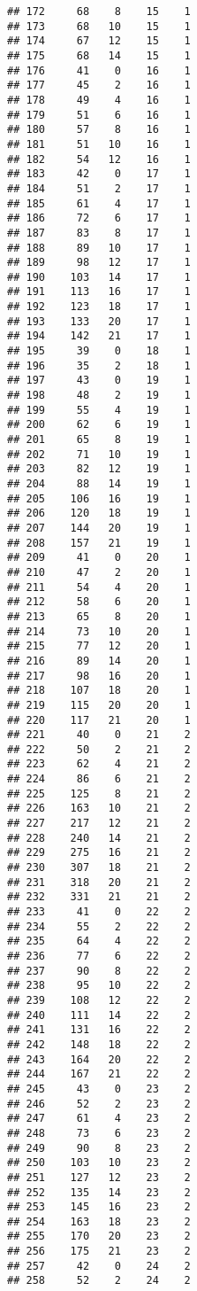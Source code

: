 \documentclass[
]{article}
\begin{document}
\begin{verbatim}
## 172     68    8    15    1
## 173     68   10    15    1
## 174     67   12    15    1
## 175     68   14    15    1
## 176     41    0    16    1
## 177     45    2    16    1
## 178     49    4    16    1
## 179     51    6    16    1
## 180     57    8    16    1
## 181     51   10    16    1
## 182     54   12    16    1
## 183     42    0    17    1
## 184     51    2    17    1
## 185     61    4    17    1
## 186     72    6    17    1
## 187     83    8    17    1
## 188     89   10    17    1
## 189     98   12    17    1
## 190    103   14    17    1
## 191    113   16    17    1
## 192    123   18    17    1
## 193    133   20    17    1
## 194    142   21    17    1
## 195     39    0    18    1
## 196     35    2    18    1
## 197     43    0    19    1
## 198     48    2    19    1
## 199     55    4    19    1
## 200     62    6    19    1
## 201     65    8    19    1
## 202     71   10    19    1
## 203     82   12    19    1
## 204     88   14    19    1
## 205    106   16    19    1
## 206    120   18    19    1
## 207    144   20    19    1
## 208    157   21    19    1
## 209     41    0    20    1
## 210     47    2    20    1
## 211     54    4    20    1
## 212     58    6    20    1
## 213     65    8    20    1
## 214     73   10    20    1
## 215     77   12    20    1
## 216     89   14    20    1
## 217     98   16    20    1
## 218    107   18    20    1
## 219    115   20    20    1
## 220    117   21    20    1
## 221     40    0    21    2
## 222     50    2    21    2
## 223     62    4    21    2
## 224     86    6    21    2
## 225    125    8    21    2
## 226    163   10    21    2
## 227    217   12    21    2
## 228    240   14    21    2
## 229    275   16    21    2
## 230    307   18    21    2
## 231    318   20    21    2
## 232    331   21    21    2
## 233     41    0    22    2
## 234     55    2    22    2
## 235     64    4    22    2
## 236     77    6    22    2
## 237     90    8    22    2
## 238     95   10    22    2
## 239    108   12    22    2
## 240    111   14    22    2
## 241    131   16    22    2
## 242    148   18    22    2
## 243    164   20    22    2
## 244    167   21    22    2
## 245     43    0    23    2
## 246     52    2    23    2
## 247     61    4    23    2
## 248     73    6    23    2
## 249     90    8    23    2
## 250    103   10    23    2
## 251    127   12    23    2
## 252    135   14    23    2
## 253    145   16    23    2
## 254    163   18    23    2
## 255    170   20    23    2
## 256    175   21    23    2
## 257     42    0    24    2
## 258     52    2    24    2

\end{verbatim}
\end{document}

